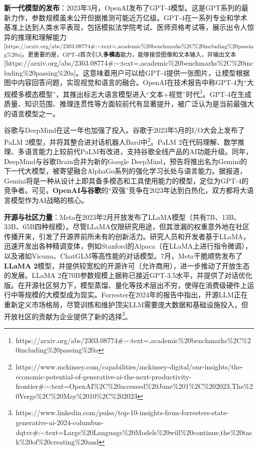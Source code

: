 \documentclass[
  letterpaper,
]{scrbook}
\begin{document}
\textbf{新一代模型的发布}：2023年3月，OpenAI发布了GPT-4模型。这是GPT系列的最新力作，参数规模虽未公开但据推测可能近万亿级。GPT-4在一系列专业和学术基准上达到人类水平表现，包括模拟法学院考试、医师资格考试等，展示出令人惊异的推理和理解能力\textsuperscript{{[}https://arxiv.org/abs/2303.08774\#:\textasciitilde:text=,academic\%20benchmarks\%2C\%20including\%20passing\%20a{]}。更重要的是，GPT-4首次引入\textbf{多模态}能力，能够接受图像和文本输入，并输出文本}{[}https://arxiv.org/abs/2303.08774\#:\textasciitilde:text=,academic\%20benchmarks\%2C\%20including\%20passing\%20a{]}。这意味着用户可以给GPT-4提供一张图片，让模型根据图中内容回答问题，实现视觉和语言的融合。OpenAI在技术报告中称GPT-4为``大规模多模态模型''，其推出标志大语言模型进入``文本+视觉''时代\footnote{https://arxiv.org/abs/2303.08774\#:\textasciitilde:text=,academic\%20benchmarks\%2C\%20including\%20passing\%20a}。GPT-4在生成质量、知识范围、推理连贯性等方面较前代有显著提升，被广泛认为是当前最强大的语言模型之一。

谷歌与DeepMind在这一年也加强了投入。谷歌于2023年5月的I/O大会上发布了PaLM
2模型，并将其整合进对话机器人Bard中\footnote{https://www.mckinsey.com/capabilities/mckinsey-digital/our-insights/the-economic-potential-of-generative-ai-the-next-productivity-frontier\#:\textasciitilde:text=OpenAI\%2C\%20accessed\%20June\%201\%2C\%202023,The\%20Verge\%2C\%20May\%2010\%2C\%202023}。PaLM
2在代码理解、数学推理、多语言能力上较前代PaLM有改进，支持谷歌全线产品的AI功能升级。同年，DeepMind与谷歌Brain合并为新的Google
DeepMind，预告将推出名为Gemini的下一代大模型，被寄望融合AlphaGo系列的强化学习长处与语言能力。据报道，Gemini将是一种从设计上即具备多模态和工具使用能力的模型，定位为GPT-4的竞争者。可见，\textbf{OpenAI与谷歌}的``双强''竞争在2023年达到白热化，双方都将大语言模型作为AI战略的核心。

\textbf{开源与社区力量}：Meta在2023年2月开放发布了LLaMA模型（共有7B、13B、33B、65B四种规模）。尽管LLaMA仅限研究用途，但其泄漏的权重意外地在社区传播开来，引发了开源界前所未有的创新活力。研究人员和开发者基于LLaMA，迅速开发出各种精调变体，例如Stanford的Alpaca（在LLaMA上进行指令微调），以及诸如Vicuna、ChatGLM等高性能的对话模型。7月，Meta干脆顺势发布了\textbf{LLaMA
2}模型，并提供较宽松的开源许可（允许商用），进一步推动了开放生态的发展。LLaMA
2在70B参数规模上据称已接近GPT-3.5水平，并提供了对话优化版。在开源社区努力下，模型蒸馏、量化等技术层出不穷，使得在消费级硬件上运行中等规模的大模型成为现实。Forrester在2024年的报告中指出，开源LLM正在重新定义市场格局，尽管训练和维护顶尖LLM需要庞大数据和基础设施投入，但开放社区的贡献为企业提供了新的选择\footnote{https://www.linkedin.com/pulse/top-10-insights-from-forresters-state-generative-ai-2024-columbus-dqtvc\#:\textasciitilde:text=Large\%20Language\%20Models\%20will\%20continue,the\%20task\%20of\%20creating\%20and}。
\end{document}
